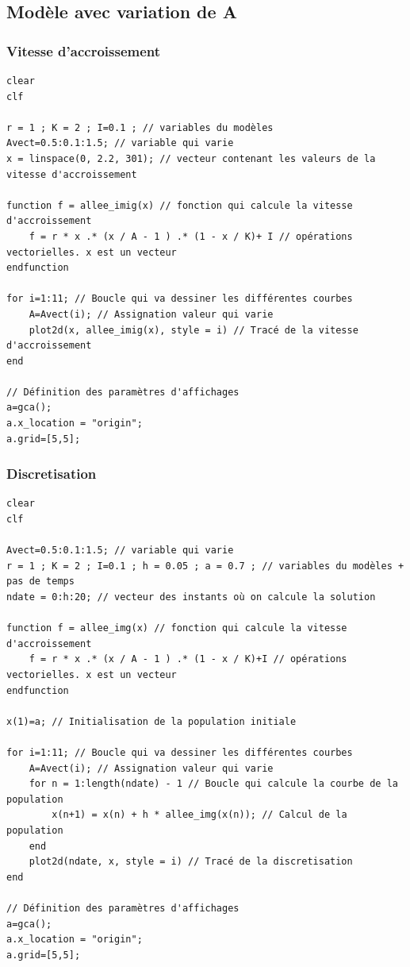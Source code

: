 \documentclass{article}
\begin{document}
\subsection{Modèle avec variation de A}

\subsubsection{Vitesse d'accroissement}

\begin{verbatim}
clear
clf

r = 1 ; K = 2 ; I=0.1 ; // variables du modèles
Avect=0.5:0.1:1.5; // variable qui varie
x = linspace(0, 2.2, 301); // vecteur contenant les valeurs de la vitesse d'accroissement

function f = allee_imig(x) // fonction qui calcule la vitesse d'accroissement
    f = r * x .* (x / A - 1 ) .* (1 - x / K)+ I // opérations vectorielles. x est un vecteur
endfunction

for i=1:11; // Boucle qui va dessiner les différentes courbes
    A=Avect(i); // Assignation valeur qui varie
    plot2d(x, allee_imig(x), style = i) // Tracé de la vitesse d'accroissement
end

// Définition des paramètres d'affichages
a=gca();
a.x_location = "origin";
a.grid=[5,5];
\end{verbatim}

\subsubsection{Discretisation}

\begin{verbatim}
clear
clf

Avect=0.5:0.1:1.5; // variable qui varie
r = 1 ; K = 2 ; I=0.1 ; h = 0.05 ; a = 0.7 ; // variables du modèles + pas de temps
ndate = 0:h:20; // vecteur des instants où on calcule la solution

function f = allee_img(x) // fonction qui calcule la vitesse d'accroissement
    f = r * x .* (x / A - 1 ) .* (1 - x / K)+I // opérations vectorielles. x est un vecteur
endfunction

x(1)=a; // Initialisation de la population initiale

for i=1:11; // Boucle qui va dessiner les différentes courbes
    A=Avect(i); // Assignation valeur qui varie
    for n = 1:length(ndate) - 1 // Boucle qui calcule la courbe de la population
        x(n+1) = x(n) + h * allee_img(x(n)); // Calcul de la population
    end 
    plot2d(ndate, x, style = i) // Tracé de la discretisation
end

// Définition des paramètres d'affichages
a=gca();
a.x_location = "origin";
a.grid=[5,5];
\end{verbatim}
\end{document}
